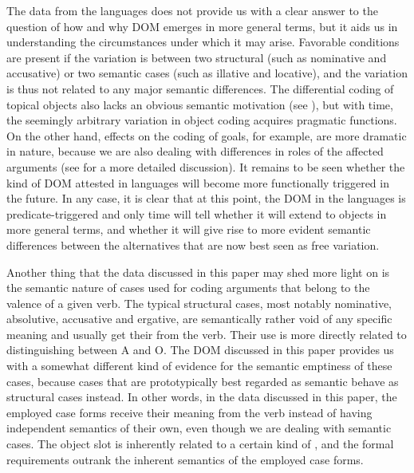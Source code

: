 \documentclass[output=paper]{LSP/langsci}
\begin{document}
 The data from the  languages does not provide us with a clear answer to the question of how and why DOM emerges in more general terms, but it aids us in understanding the circumstances under which it may arise. Favorable conditions are present if the variation is between two structural (such as nominative and accusative) or two semantic cases (such as illative and locative), and the variation is thus not related to any major semantic differences. The differential coding of topical objects also lacks an obvious semantic motivation (see \citealt{Iemmolo2011Towards}), but with time, the seemingly arbitrary variation in object coding acquires pragmatic functions. On the other hand,  effects on the coding of goals, for example, are more dramatic in nature, because we are also dealing with differences in roles of the affected arguments (see \citealt{Kittila2008Animacy} for a more detailed discussion). It remains to be seen whether the kind of DOM attested in  languages will become more functionally triggered in the future. In any case, it is clear that at this point, the DOM in the  languages is predicate-triggered and only time will tell whether it will extend to objects in more general terms, and whether it will give rise to more evident semantic differences between the alternatives that are now best seen as free variation.

 Another thing that the data discussed in this paper may shed more light on is the semantic nature of cases used for coding arguments that belong to the valence of a given verb. The typical structural cases, most notably nominative, absolutive, accusative and ergative, are semantically rather void of any specific meaning and usually get their  from the verb. Their use is more directly related to distinguishing between A and O. The DOM discussed in this paper provides us with a somewhat different kind of evidence for the semantic emptiness of these cases, because cases that are prototypically best regarded as semantic behave as structural cases instead. In other words, in the data discussed in this paper, the employed case forms receive their meaning from the verb instead of having independent semantics of their own, even though we are dealing with semantic cases. The object slot is inherently related to a certain kind of , and the formal requirements outrank the inherent semantics of the employed case forms.
\end{document}
